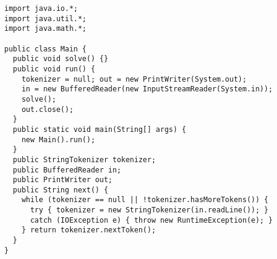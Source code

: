 \begin{lstlisting}
import java.io.*;
import java.util.*;
import java.math.*;

public class Main {
  public void solve() {}
  public void run() {
    tokenizer = null; out = new PrintWriter(System.out);
    in = new BufferedReader(new InputStreamReader(System.in));
    solve();
    out.close();
  }
  public static void main(String[] args) {
    new Main().run();
  }
  public StringTokenizer tokenizer;
  public BufferedReader in;
  public PrintWriter out;
  public String next() {
    while (tokenizer == null || !tokenizer.hasMoreTokens()) {
      try { tokenizer = new StringTokenizer(in.readLine()); }
      catch (IOException e) { throw new RuntimeException(e); }
    } return tokenizer.nextToken();
  }
}
\end{lstlisting}